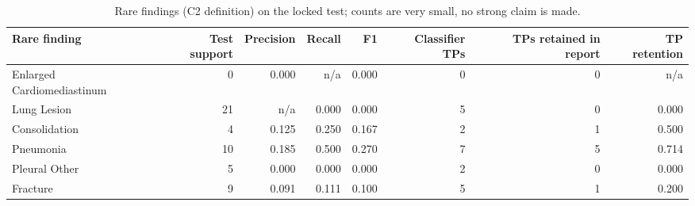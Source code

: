 \begin{table}[t]
\centering
\scriptsize
\begin{tabular}{lrrrrrrr}
\hline
Rare finding & Test support & Precision & Recall & F1 & Classifier TPs & TPs retained in report & TP retention \\
\hline
Enlarged Cardiomediastinum & 0 & 0.000 & n/a & 0.000 & 0 & 0 & n/a \\
Lung Lesion & 21 & n/a & 0.000 & 0.000 & 5 & 0 & 0.000 \\
Consolidation & 4 & 0.125 & 0.250 & 0.167 & 2 & 1 & 0.500 \\
Pneumonia & 10 & 0.185 & 0.500 & 0.270 & 7 & 5 & 0.714 \\
Pleural Other & 5 & 0.000 & 0.000 & 0.000 & 2 & 0 & 0.000 \\
Fracture & 9 & 0.091 & 0.111 & 0.100 & 5 & 1 & 0.200 \\
\hline
\end{tabular}
\caption{Rare findings (C2 definition) on the locked test; counts are very small, no strong claim is made.}
\label{tab:table7_rare_finding_analysis}
\end{table}
